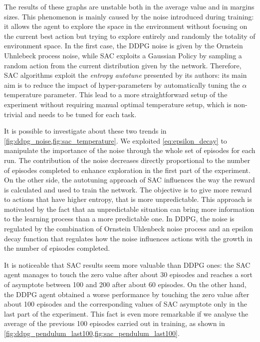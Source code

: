The results of these graphs are unstable both in the average value and in margins sizes.
This phenomenon is mainly caused by the noise introduced during training: it allows the agent to explore the space in the environment without focusing on the current best action but trying to explore entirely and randomly the totality of environment space.
In the first case, the DDPG noise is given by the Ornstein Uhnlebeck process noise, while SAC exploits a Gaussian Policy by sampling a random action from the current distribution given by the network.
Therefore, SAC algorithms exploit the \textit{entropy autotune} presented by its authors: its main aim is to reduce the impact of hyper-parameters by automatically tuning the $\alpha$ temperature parameter.
This lead to a more straightforward setup of the experiment without requiring manual optimal temperature setup, which is non-trivial and needs to be tuned for each task.

It is possible to investigate about these two trends in \vref{fig:ddpg_noise,fig:sac_temperature}.
We exploited \vref{eq:epsilon_decay} to manipulate the importance of the noise through the whole set of episodes for each run.
The contribution of the noise decreases directly proportional to the number of episodes completed to enhance exploration in the first part of the experiment.
On the other side, the autotuning approach of SAC influences the way the reward is calculated and used to train the network.
The objective is to give more reward to actions that have higher entropy, that is more unpredictable.
This approach is motivated by the fact that an unpredictable situation can bring more information to the learning process than a more predictable one.
In DDPG, the noise is regulated by the combination of Ornstein Uhlenbeck noise process and an epsilon decay function that regulates how the noise influences actions with the growth in the number of episodes completed.

It is noticeable that SAC results seem more valuable than DDPG ones: the SAC agent manages to touch the zero value after about 30 episodes and reaches a sort of asymptote between 100 and 200 after about 60 episodes.
On the other hand, the DDPG agent obtained a worse performance by touching the zero value after about 100 episodes and the corresponding values of SAC asymptote only in the last part of the experiment.
This fact is even more remarkable if we analyse the average of the previous 100 episodes carried out in training, as shown in \vref{fig:ddpg_pendulum_last100,fig:sac_pendulum_last100}.

